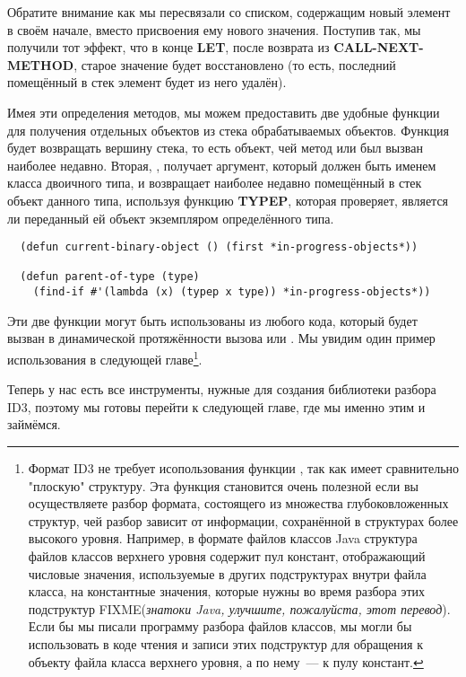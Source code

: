 Обратите внимание как мы пересвязали  со списком, содержащим
новый элемент в своём начале, вместо присвоения ему нового значения. Поступив так, мы
получили тот эффект, что в конце \textbf{LET}, после возврата из
\textbf{CALL-NEXT-METHOD}, старое значение  будет
восстановлено (то есть, последний помещённый в стек элемент будет из него удалён).

Имея эти определения методов, мы можем предоставить две удобные функции для получения
отдельных объектов из стека обрабатываемых объектов. Функция 
будет возвращать вершину стека, то есть объект, чей метод  или
 был вызван наиболее недавно. Вторая, , получает
аргумент, который должен быть именем класса двоичного типа, и возвращает наиболее недавно
помещённый в стек объект данного типа, используя функцию \textbf{TYPEP}, которая
проверяет, является ли переданный ей объект экземпляром определённого типа.

\begin{lstlisting}
  (defun current-binary-object () (first *in-progress-objects*))

  (defun parent-of-type (type)
    (find-if #'(lambda (x) (typep x type)) *in-progress-objects*))
\end{lstlisting}

Эти две функции могут быть использованы из любого кода, который будет вызван в
динамической протяжённости вызова  или . Мы увидим
один пример использования  в следующей главе\footnote{Формат
  ID3 не требует исопользования функции , так как имеет сравнительно
  "плоскую" структуру. Эта функция становится очень полезной если вы осуществляете разбор
  формата, состоящего из множества глубоковложенных структур, чей разбор зависит от
  информации, сохранённой в структурах более высокого уровня. Например, в формате файлов
  классов Java структура файлов классов верхнего уровня содержит пул констант,
  отображающий числовые значения, используемые в других подструктурах внутри файла класса,
  на константные значения, которые нужны во время разбора этих подструктур
  FIXME(\textit{знатоки Java, улучшите, пожалуйста, этот перевод}). Если бы мы писали
  программу разбора файлов классов, мы могли бы использовать  в коде
  чтения и записи этих подструктур для обращения к объекту файла класса верхнего уровня, а
  по нему~--- к пулу констант.}.

Теперь у нас есть все инструменты, нужные для создания библиотеки разбора ID3, поэтому мы
готовы перейти к следующей главе, где мы именно этим и займёмся.


